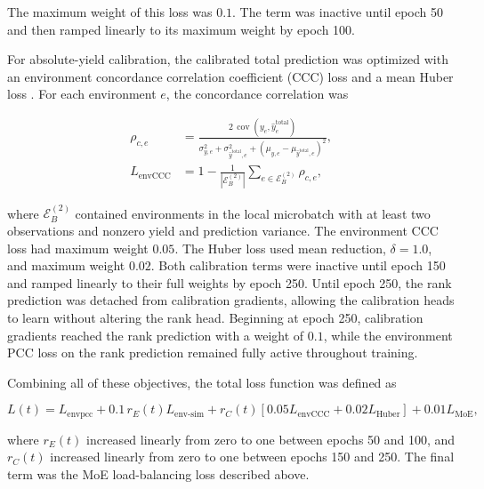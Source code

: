 The maximum weight of this loss was $0.1$. The term was inactive until epoch 50 and then ramped linearly to its maximum weight by epoch 100.

For absolute-yield calibration, the calibrated total prediction was optimized with an environment concordance correlation coefficient (CCC) loss \cite{lin1989concordance} and a mean Huber loss \cite{huber1964robust}. For each environment $e$, the concordance correlation was

\begin{equation}\label{eq:ch3-ccc-loss}
\begin{aligned}
    \rho_{c,e}
    &= \frac{2\,\operatorname{cov}\!\left(y_e,\hat{y}^{\mathrm{total}}_e\right)}
    {\sigma_{y,e}^{2}+\sigma_{\hat{y}^{\mathrm{total}},e}^{2}
    +\left(\mu_{y,e}-\mu_{\hat{y}^{\mathrm{total}},e}\right)^2}, \\
    L_{\mathrm{envCCC}}
    &= 1-\frac{1}{|\mathcal{E}^{(2)}_B|}
    \sum_{e \in \mathcal{E}^{(2)}_B}\rho_{c,e},
\end{aligned}
\end{equation}

where $\mathcal{E}^{(2)}_B$ contained environments in the local microbatch with at least two observations and nonzero yield and prediction variance. The environment CCC loss had maximum weight $0.05$. The Huber loss used mean reduction, $\delta=1.0$, and maximum weight $0.02$. Both calibration terms were inactive until epoch 150 and ramped linearly to their full weights by epoch 250. Until epoch 250, the rank prediction was detached from calibration gradients, allowing the calibration heads to learn without altering the rank head. Beginning at epoch 250, calibration gradients reached the rank prediction with a weight of $0.1$, while the environment PCC loss on the rank prediction remained fully active throughout training.

Combining all of these objectives, the total loss function was defined as

\begin{equation}\label{eq:ch3-total-loss}
    L(t) = L_{\mathrm{envpcc}}
    + 0.1\,r_E(t)L_{\mathrm{env\text{-}sim}}
    + r_C(t)\left[0.05L_{\mathrm{envCCC}} + 0.02L_{\mathrm{Huber}}\right]
    + 0.01L_{\mathrm{MoE}},
\end{equation}

where $r_E(t)$ increased linearly from zero to one between epochs 50 and 100, and $r_C(t)$ increased linearly from zero to one between epochs 150 and 250. The final term was the MoE load-balancing loss described above.

